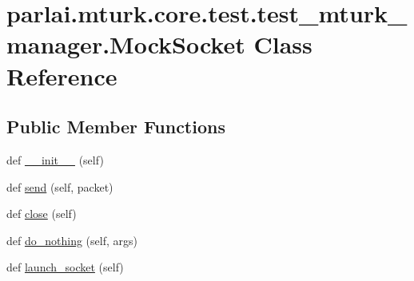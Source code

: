 \hypertarget{classparlai_1_1mturk_1_1core_1_1test_1_1test__mturk__manager_1_1MockSocket}{}\section{parlai.\+mturk.\+core.\+test.\+test\+\_\+mturk\+\_\+manager.\+Mock\+Socket Class Reference}
\label{classparlai_1_1mturk_1_1core_1_1test_1_1test__mturk__manager_1_1MockSocket}
\subsection*{Public Member Functions}
\begin{DoxyCompactItemize}
\item 
def \hyperlink{classparlai_1_1mturk_1_1core_1_1test_1_1test__mturk__manager_1_1MockSocket_a9c0f4f7ec371dcf43c515fecdcc5c282}{\+\_\+\+\_\+init\+\_\+\+\_\+} (self)
\item 
def \hyperlink{classparlai_1_1mturk_1_1core_1_1test_1_1test__mturk__manager_1_1MockSocket_a2c9e08630bf5b3d476aac4411c22f096}{send} (self, packet)
\item 
def \hyperlink{classparlai_1_1mturk_1_1core_1_1test_1_1test__mturk__manager_1_1MockSocket_aa77f36c7f5a11e544ab32904c6fdc9af}{close} (self)
\item 
def \hyperlink{classparlai_1_1mturk_1_1core_1_1test_1_1test__mturk__manager_1_1MockSocket_ab9a60af1ed619d0f22407addd7e7414a}{do\+\_\+nothing} (self, args)
\item 
def \hyperlink{classparlai_1_1mturk_1_1core_1_1test_1_1test__mturk__manager_1_1MockSocket_ad3997c8e66f14abcd17eb9510ef918e0}{launch\+\_\+socket} (self)
\end{DoxyCompactItemize}
